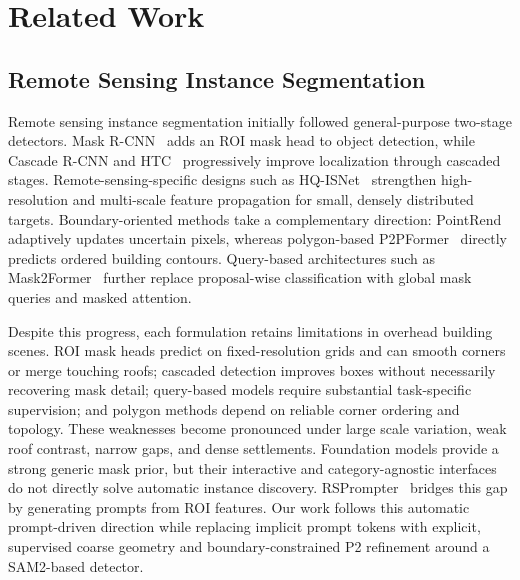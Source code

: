 \documentclass[letterpaper,journal]{IEEEtran}
\begin{document}
\section{Related Work}
\label{sec:related}

\subsection{Remote Sensing Instance Segmentation}
Remote sensing instance segmentation initially followed general-purpose two-stage detectors. Mask R-CNN~\cite{ref_maskrcnn} adds an ROI mask head to object detection, while Cascade R-CNN and HTC~\cite{ref_cascade,ref_htc} progressively improve localization through cascaded stages. Remote-sensing-specific designs such as HQ-ISNet~\cite{ref_hqisnet} strengthen high-resolution and multi-scale feature propagation for small, densely distributed targets. Boundary-oriented methods take a complementary direction: PointRend~\cite{ref_pointrend} adaptively updates uncertain pixels, whereas polygon-based P2PFormer~\cite{ref_p2pformer} directly predicts ordered building contours. Query-based architectures such as Mask2Former~\cite{ref_mask2former} further replace proposal-wise classification with global mask queries and masked attention.

Despite this progress, each formulation retains limitations in overhead building scenes. ROI mask heads predict on fixed-resolution grids and can smooth corners or merge touching roofs; cascaded detection improves boxes without necessarily recovering mask detail; query-based models require substantial task-specific supervision; and polygon methods depend on reliable corner ordering and topology. These weaknesses become pronounced under large scale variation, weak roof contrast, narrow gaps, and dense settlements. Foundation models provide a strong generic mask prior, but their interactive and category-agnostic interfaces do not directly solve automatic instance discovery. RSPrompter~\cite{ref_rsprompter} bridges this gap by generating prompts from ROI features. Our work follows this automatic prompt-driven direction while replacing implicit prompt tokens with explicit, supervised coarse geometry and boundary-constrained P2 refinement around a SAM2-based detector.
\end{document}
